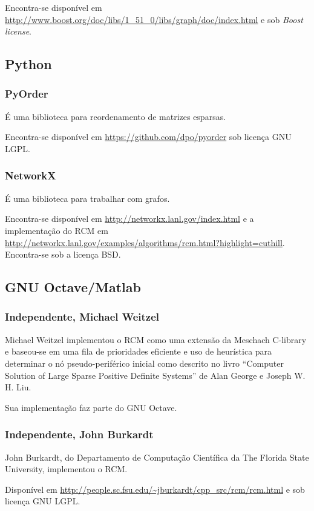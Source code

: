 Encontra-se disponível em
\url{http://www.boost.org/doc/libs/1_51_0/libs/graph/doc/index.html} e sob
\textit{Boost license}.

\subsection{Python}
\subsubsection{PyOrder}
É uma biblioteca para reordenamento de matrizes esparsas.

Encontra-se disponível em \url{https://github.com/dpo/pyorder} sob licença GNU
LGPL.

\subsubsection{NetworkX}
É uma biblioteca para trabalhar com grafos.

Encontra-se disponível em \url{http://networkx.lanl.gov/index.html} e a
implementação do RCM em
\url{http://networkx.lanl.gov/examples/algorithms/rcm.html?highlight=cuthill}.
Encontra-se sob a licença BSD.

\subsection{GNU Octave/Matlab}
\subsubsection{Independente, Michael Weitzel}
Michael Weitzel implementou o RCM como uma extensão da Meschach
C-library e baseou-se em uma fila de prioridades eficiente e uso de
heurística para determinar o nó pseudo-periférico inicial como
descrito no livro ``Computer Solution of Large Sparse Positive Definite
Systems'' de Alan George
e Joseph W. H. Liu.

Sua implementação faz parte do GNU Octave.

\subsubsection{Independente, John Burkardt}
John Burkardt, do Departamento de Computação Científica da The Florida State
University, implementou o RCM.

Disponível em \url{http://people.sc.fsu.edu/~jburkardt/cpp_src/rcm/rcm.html} e
sob licença GNU LGPL.
